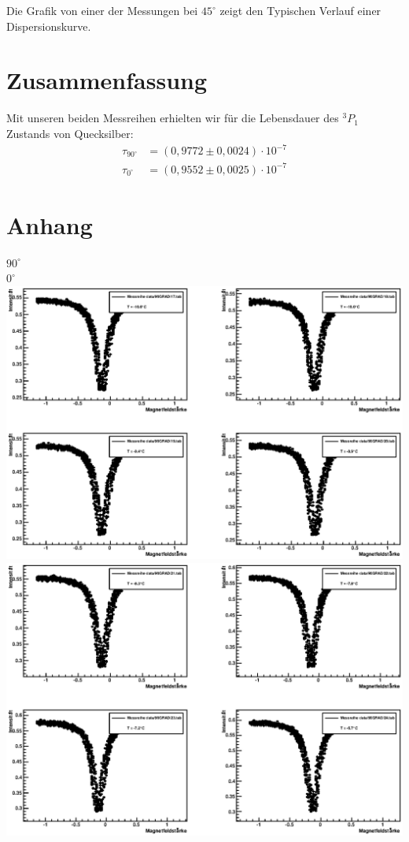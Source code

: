 \documentclass[12pt]{article}
\begin{document}
Die Grafik von einer der Messungen bei $45^\circ$ zeigt den Typischen Verlauf einer Dispersionskurve.

\section{Zusammenfassung}
Mit unseren beiden Messreihen erhielten wir für die Lebensdauer des $^3P_1$ Zustands von Quecksilber:
\begin{align*}
 \tau_{90^\circ} &= (0,9772 \pm 0,0024) \cdot 10^{-7} \\
 \tau_{0^\circ} &= (0,9552 \pm 0,0025) \cdot 10^{-7}
\end{align*}

\section{Anhang}
\singlespacing
\centering
\newpage
\textbf{$90^\circ$} \\

\newpage
\textbf{$0^\circ$} \\

\newpage
\includegraphics[width=1\linewidth]{pictures/1.eps} \\
\includegraphics[width=1\linewidth]{pictures/2.eps} \\
\end{document}
